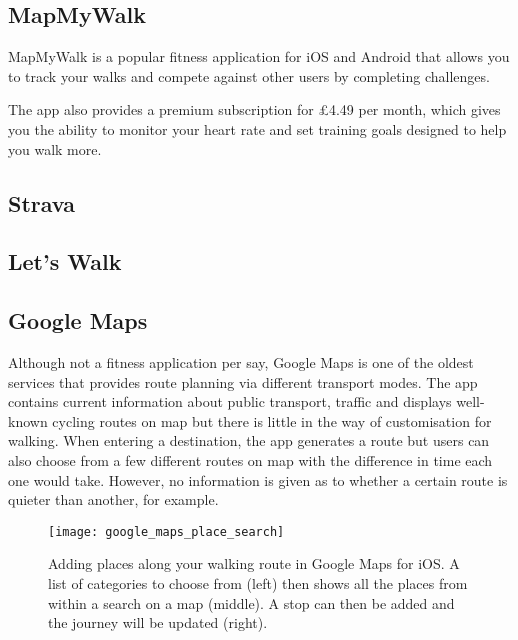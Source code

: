 
\subsection{MapMyWalk}

MapMyWalk \cite{Map} is a popular fitness application for iOS and Android that allows you to track your walks and compete against other users by completing challenges. 

The app also provides a premium subscription for \pounds4.49 per month, which gives you the ability to monitor your heart rate and set training goals designed to help you walk more.

\subsection{Strava}

\subsection{Let's Walk}

\subsection{Google Maps}

Although not a fitness application per say, Google Maps \cite{GoogleInc.} is one of the oldest services that provides route planning via different transport modes. The app contains current information about public transport, traffic and displays well-known cycling routes on map but there is little in the way of customisation for walking. When entering a destination, the app generates a route but users can also choose from a few different routes on map with the difference in time each one would take. However, no information is given as to whether a certain route is quieter than another, for example.


\begin{figure}[hbt]
  \centering
  \texttt{[image: google\_maps\_place\_search]}
  \caption{Adding places along your walking route in Google Maps for iOS. A list of categories to choose from (left) then shows all the places from within a search on a map (middle). A stop can then be added and the journey will be updated (right).}
  \label{fig:google_maps_place_search}
\end{figure}


